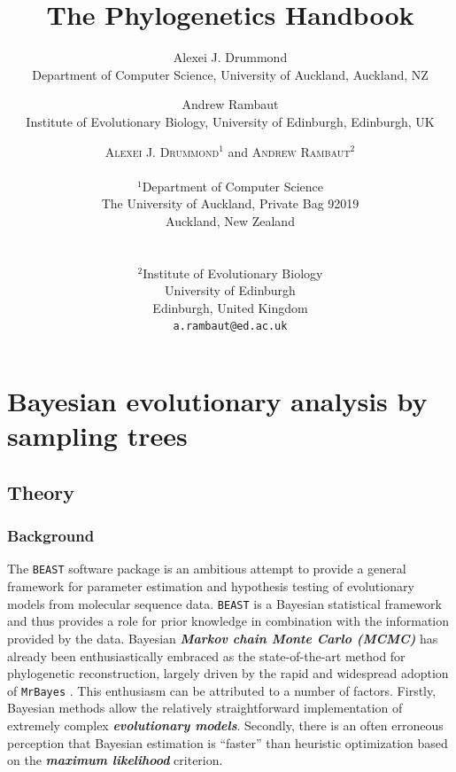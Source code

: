 \documentclass[cup7b, english]{cupbook}
\title{The Phylogenetics Handbook}
\begin{document}
\maketitle
\tableofcontents
\cleardoublepage
{}

\setcounter{chapter}{17}

\author[Alexei J. Drummond and Andrew Rambaut] 
{Alexei J. Drummond \\ Department of Computer Science, 
University of Auckland, Auckland, NZ
\and
Andrew Rambaut \\ Institute of Evolutionary Biology, University of Edinburgh, 
 Edinburgh, UK}

\chapter{Bayesian evolutionary analysis by sampling trees}

\author{\textsc{Alexei J. Drummond}$^{1}$ and \textsc{Andrew Rambaut}$^{2}$\\
 \\
$^{1}$Department of Computer Science\\
 The University of Auckland, Private Bag 92019\\
 Auckland, New Zealand\\
\\
\\
$^{2}$Institute of Evolutionary Biology\\
 University of Edinburgh\\
 Edinburgh, United Kingdom\\
 \texttt{a.rambaut@ed.ac.uk} }

\section{Theory}

\subsection{Background}

The \texttt{BEAST} software package is an ambitious attempt to provide a general
framework for parameter estimation and hypothesis testing of evolutionary
models from molecular sequence data. \texttt{BEAST} is a Bayesian statistical
framework and thus provides a role for prior knowledge in combination with the
information provided by the data. Bayesian \textbf{\textit{Markov chain Monte Carlo (MCMC)}} has 
already been enthusiastically embraced as the state-of-the-art method for phylogenetic 
reconstruction, largely driven by the rapid and widespread adoption of \texttt{MrBayes}
\cite{HR2001}. This enthusiasm can be attributed to a number of factors.
Firstly, Bayesian methods allow the relatively straightforward implementation
of extremely complex \textbf{\textit{evolutionary models}}. Secondly, there is an often erroneous 
perception that Bayesian estimation is ``faster'' than heuristic
optimization based on the \textbf{\textit{maximum likelihood}} criterion.
\end{document}
